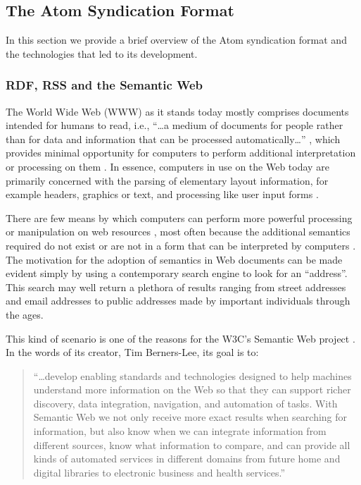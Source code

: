 \documentclass{CRPITStyle}
\begin{document}
\subsection{The Atom Syndication Format}
\label{sec-atom-overview}

In this section we provide a brief overview of the Atom syndication
format and the technologies that led to its development.


\subsubsection{RDF, RSS and the Semantic Web}
\label{sec-rdf-rss}

The World Wide Web (WWW) as it stands today mostly comprises documents
intended for humans to read, i.e., ``\ldots{}a medium of documents for
people rather than for data and information that can be processed
automatically\ldots'' \cite{Bern-T-2001-SciAm}, which provides minimal
opportunity for computers to perform additional interpretation or
processing on them \cite{Bern-T-1999-WWW,Bern-T-2001-SciAm}. In essence,
computers in use on the Web today are primarily concerned with the
parsing of elementary layout information, for example headers, graphics
or text, and processing like user input forms
\cite{Bern-T-1999-W3C,Bern-T-2001-SciAm}.

There are few means by which computers can perform more powerful
processing or manipulation on web resources
\cite{Bern-T-2001-SciAm,Fens-D-2003}, most often because the additional
semantics required do not exist or are not in a form that can be
interpreted by computers \cite{Koiv-MR-2001-W3C}. The motivation for the
adoption of semantics in Web documents can be made evident simply by
using a contemporary search engine to look for an ``address''. This
search may well return a plethora of results ranging from street
addresses and email addresses to public addresses made by important
individuals through the ages.

This kind of scenario is one of the reasons for the W3C's Semantic Web
project \cite{Koiv-MR-2001-W3C}. In the words of its creator, Tim
Berners-Lee, its goal is to:

\begin{quotation}
	``\ldots{}develop enabling standards and technologies designed to
	help machines understand more information on the Web so that they
	can support richer discovery, data integration, navigation, and
	automation of tasks. With Semantic Web we not only receive more
	exact results when searching for information, but also know when we
	can integrate information from different sources, know what
	information to compare, and can provide all kinds of automated
	services in different domains from future home and digital libraries
	to electronic business and health services.''
	\cite{Koiv-MR-2001-W3C}
\end{quotation}
\end{document}
